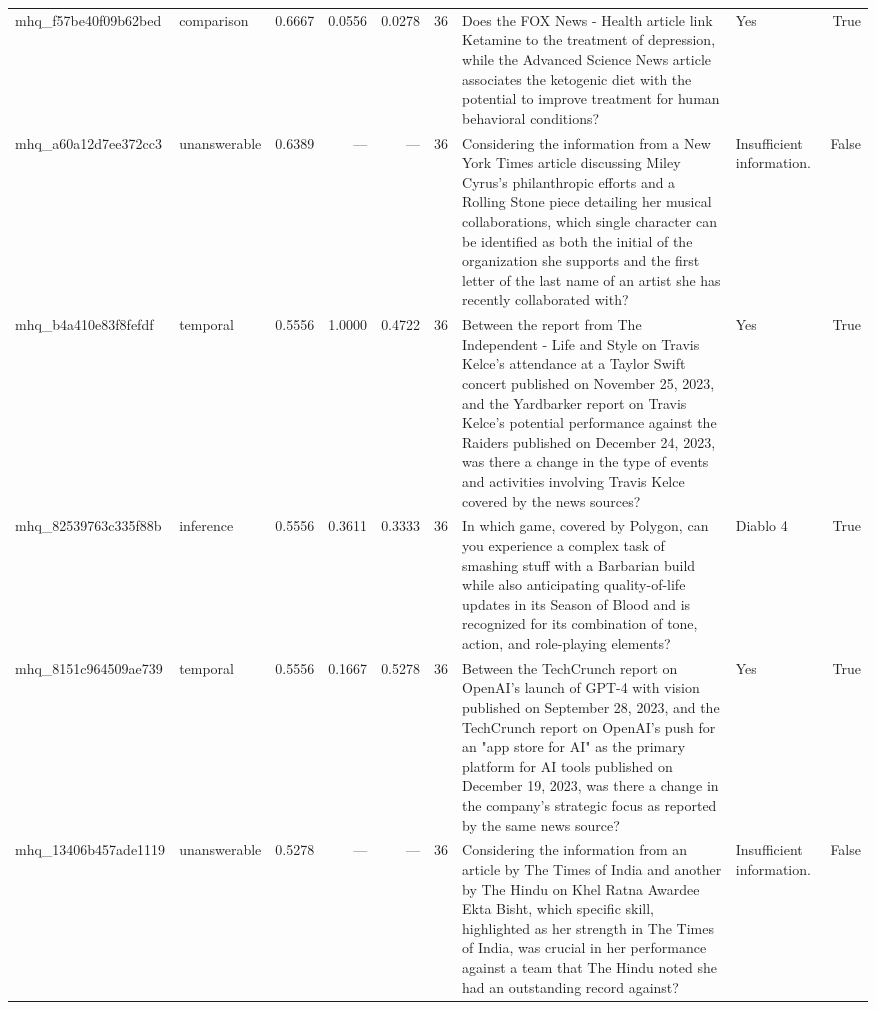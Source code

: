 \begin{tabular}{llrrrrllr}
mhq_f57be40f09b62bed & comparison & 0.6667 & 0.0556 & 0.0278 & 36 & Does the FOX News - Health article link Ketamine to the treatment of depression, while the Advanced Science News article associates the ketogenic diet with the potential to improve treatment for human behavioral conditions? & Yes & True \\
mhq_a60a12d7ee372cc3 & unanswerable & 0.6389 & — & — & 36 & Considering the information from a New York Times article discussing Miley Cyrus's philanthropic efforts and a Rolling Stone piece detailing her musical collaborations, which single character can be identified as both the initial of the organization she supports and the first letter of the last name of an artist she has recently collaborated with? & Insufficient information. & False \\
mhq_b4a410e83f8fefdf & temporal & 0.5556 & 1.0000 & 0.4722 & 36 & Between the report from The Independent - Life and Style on Travis Kelce's attendance at a Taylor Swift concert published on November 25, 2023, and the Yardbarker report on Travis Kelce's potential performance against the Raiders published on December 24, 2023, was there a change in the type of events and activities involving Travis Kelce covered by the news sources? & Yes & True \\
mhq_82539763c335f88b & inference & 0.5556 & 0.3611 & 0.3333 & 36 & In which game, covered by Polygon, can you experience a complex task of smashing stuff with a Barbarian build while also anticipating quality-of-life updates in its Season of Blood and is recognized for its combination of tone, action, and role-playing elements? & Diablo 4 & True \\
mhq_8151c964509ae739 & temporal & 0.5556 & 0.1667 & 0.5278 & 36 & Between the TechCrunch report on OpenAI's launch of GPT-4 with vision published on September 28, 2023, and the TechCrunch report on OpenAI's push for an "app store for AI" as the primary platform for AI tools published on December 19, 2023, was there a change in the company's strategic focus as reported by the same news source? & Yes & True \\
mhq_13406b457ade1119 & unanswerable & 0.5278 & — & — & 36 & Considering the information from an article by The Times of India and another by The Hindu on Khel Ratna Awardee Ekta Bisht, which specific skill, highlighted as her strength in The Times of India, was crucial in her performance against a team that The Hindu noted she had an outstanding record against? & Insufficient information. & False \\

\end{tabular}
